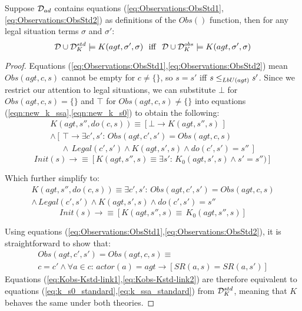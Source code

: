 \begin{thm}
Suppose $\mathcal{D}_{ad}$ contains equations (\ref{eq:Observations:ObsStd1},\ref{eq:Observations:ObsStd2})
as definitions of the $Obs()$ function, then for any legal situation
terms $\sigma$ and $\sigma'$:\[
\mathcal{D}\cup\mathcal{D}_{K}^{std}\models K(agt,\sigma',\sigma)\,\,\,\,\mathrm{iff}\,\,\,\,\mathcal{D}\cup\mathcal{D}_{K}^{obs}\models K(agt,\sigma',\sigma)\]

\end{thm}
\begin{proof}
Equations (\ref{eq:Observations:ObsStd1},\ref{eq:Observations:ObsStd2})
mean $Obs(agt,c,s)$ cannot be empty for $c\neq\{\}$, so $s=s'$
iff $s\leq_{LbU(agt)}s'$. Since we restrict our attention to legal
situations, we can substitute $\bot$ for $Obs(agt,c,s)=\{\}$ and
$\top$ for $Obs(agt,c,s)\neq\{\}$ into equations (\ref{eqn:new_k_ssa},\ref{eqn:new_k_s0})
to obtain the following:\begin{multline*}
K(agt,s'',do(c,s))\equiv\left[\bot\rightarrow K(agt,s'',s)\,\right]\\
\wedge\left[\,\top\rightarrow\exists c',s':\, Obs(agt,c',s')=Obs(agt,c,s)\right.\\
\left.\,\,\,\,\,\,\,\,\wedge\, Legal(c',s')\wedge K(agt,s',s)\wedge do(c',s')=s''\,\right]\end{multline*}
 \[
Init(s)\rightarrow\equiv\left[K(agt,s'',s)\equiv\exists s':\, K_{0}(agt,s',s)\wedge s'=s'')\right]\]


Which further simplify to:\begin{multline}
K(agt,s'',do(c,s))\equiv\exists c',s':\, Obs(agt,c',s')=Obs(agt,c,s)\\
\wedge\, Legal(c',s')\wedge K(agt,s',s)\wedge do(c',s')=s''\label{eq:Kobs-Kstd-link1}\end{multline}
 \begin{equation}
Init(s)\rightarrow\equiv\left[K(agt,s'',s)\equiv\, K_{0}(agt,s'',s)\right]\label{eq:Kobs-Kstd-link2}\end{equation}


Using equations (\ref{eq:Observations:ObsStd1},\ref{eq:Observations:ObsStd2}),
it is straightforward to show that:\begin{multline*}
Obs(agt,c',s')=Obs(agt,c,s)\equiv\\
c=c'\wedge\forall a\in c:\, actor(a)=agt\rightarrow\left[SR(a,s)=SR(a,s')\right]\end{multline*}
 Equations (\ref{eq:Kobs-Kstd-link1},\ref{eq:Kobs-Kstd-link2}) are
therefore equivalent to equations (\ref{eq:k_s0_standard},\ref{eq:k_ssa_standard})
from $\mathcal{D}_{K}^{std}$, meaning that $K$ behaves the same under both
theories. 
\end{proof}
